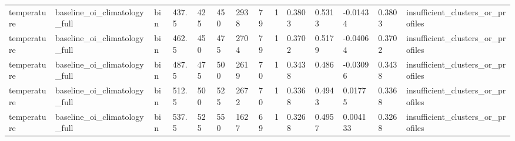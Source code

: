 \begin{table}[htbp]
\begin{tabular}{llllllllllllll}
temperature & baseline\_oi\_climatology\_full & bin & 437.5 & 425 & 450 & 2938 & 79 & 1 & 0.3803 & 0.5313 & -0.01434 & 0.3803 & insufficient\_clusters\_or\_profiles \\
temperature & baseline\_oi\_climatology\_full & bin & 462.5 & 450 & 475 & 2704 & 79 & 1 & 0.3702 & 0.5179 & -0.04064 & 0.3702 & insufficient\_clusters\_or\_profiles \\
temperature & baseline\_oi\_climatology\_full & bin & 487.5 & 475 & 500 & 2619 & 70 & 1 & 0.3438 & 0.486 & -0.03096 & 0.3438 & insufficient\_clusters\_or\_profiles \\
temperature & baseline\_oi\_climatology\_full & bin & 512.5 & 500 & 525 & 2672 & 70 & 1 & 0.3368 & 0.4943 & 0.01775 & 0.3368 & insufficient\_clusters\_or\_profiles \\
temperature & baseline\_oi\_climatology\_full & bin & 537.5 & 525 & 550 & 1627 & 69 & 1 & 0.3268 & 0.4957 & 0.004133 & 0.3268 & insufficient\_clusters\_or\_profiles \\
\bottomrule
\end{tabular}
\end{table}
